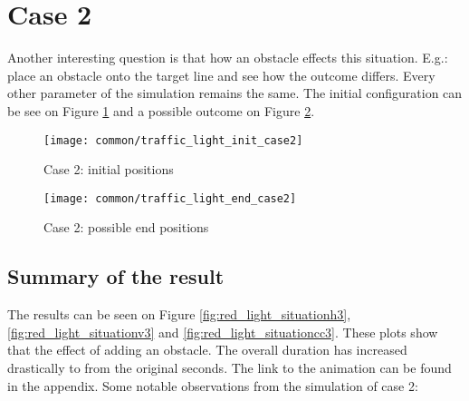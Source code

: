 		\section{Case 2}
			Another interesting question is that how an obstacle effects this situation. E.g.: place an obstacle onto the target line and see how the outcome differs. Every other parameter of the simulation remains the same. The initial configuration can be see on Figure \ref{fig:traffic_light_init2} and a possible outcome on Figure \ref{fig:traffic_light_end2}.
			\begin{figure}
				\centering
				\texttt{[image: common/traffic\_light\_init\_case2]}
				\caption{Case 2: initial positions}
				\label{fig:traffic_light_init2}
			\end{figure}
			\begin{figure}
				\centering
				\texttt{[image: common/traffic\_light\_end\_case2]}
				\caption{Case 2: possible end positions}
				\label{fig:traffic_light_end2}
			\end{figure}
			\subsection*{Summary of the result}
			The results can be seen on Figure \ref{fig:red_light_situationh3}, \ref{fig:red_light_situationv3} and \ref{fig:red_light_situationcc3}. These plots show that the effect of adding an obstacle. The overall duration has increased drastically to from the original seconds. The link to the animation can be found in the appendix.
			Some notable observations from the simulation of case 2:
			

